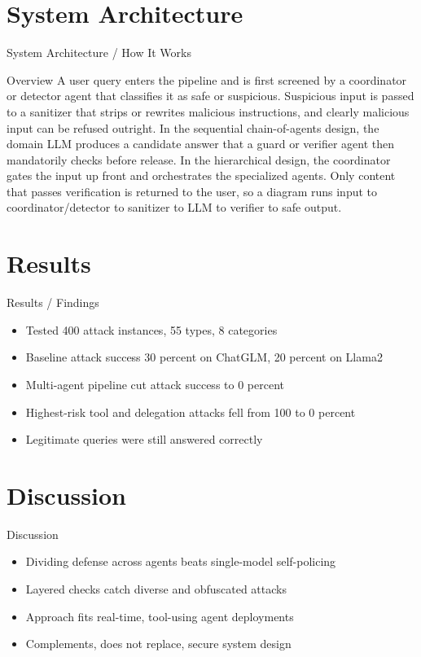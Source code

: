 \documentclass[10pt]{beamer}
\begin{document}
\section{System Architecture}
\begin{frame}{System Architecture / How It Works}
  \begin{block}{Overview}
  A user query enters the pipeline and is first screened by a coordinator or detector agent that classifies it as safe or suspicious. Suspicious input is passed to a sanitizer that strips or rewrites malicious instructions, and clearly malicious input can be refused outright. In the sequential chain-of-agents design, the domain LLM produces a candidate answer that a guard or verifier agent then mandatorily checks before release. In the hierarchical design, the coordinator gates the input up front and orchestrates the specialized agents. Only content that passes verification is returned to the user, so a diagram runs input to coordinator/detector to sanitizer to LLM to verifier to safe output.
  \end{block}
\end{frame}

\section{Results}
\begin{frame}[allowframebreaks]{Results / Findings}
\begin{itemize}
  \item Tested 400 attack instances, 55 types, 8 categories
  \item Baseline attack success 30 percent on ChatGLM, 20 percent on Llama2
  \item Multi-agent pipeline cut attack success to 0 percent
  \item Highest-risk tool and delegation attacks fell from 100 to 0 percent
  \item Legitimate queries were still answered correctly
\end{itemize}
\end{frame}

\section{Discussion}
\begin{frame}{Discussion}
\begin{itemize}
  \item Dividing defense across agents beats single-model self-policing
  \item Layered checks catch diverse and obfuscated attacks
  \item Approach fits real-time, tool-using agent deployments
  \item Complements, does not replace, secure system design
\end{itemize}
\end{frame}
\end{document}
